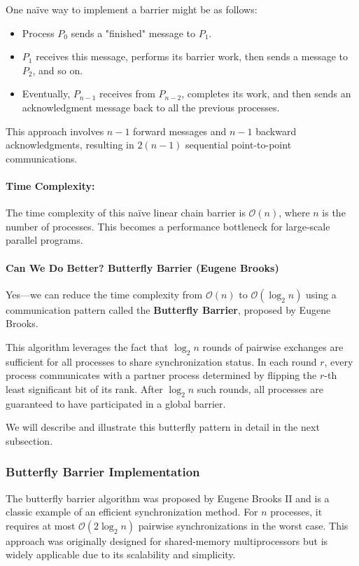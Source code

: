 \documentclass[12pt]{book}
\begin{document}
One naïve way to implement a barrier might be as follows:
\begin{itemize}
    \item Process $P_0$ sends a "finished" message to $P_1$.
    \item $P_1$ receives this message, performs its barrier work, then sends a message to $P_2$, and so on.
    \item Eventually, $P_{n-1}$ receives from $P_{n-2}$, completes its work, and then sends an acknowledgment message back to all the previous processes.
\end{itemize}
This approach involves $n - 1$ forward messages and $n - 1$ backward acknowledgments, resulting in $2(n - 1)$ sequential point-to-point communications.

\paragraph{Time Complexity:}  
The time complexity of this naïve linear chain barrier is $\mathcal{O}(n)$, where $n$ is the number of processes. This becomes a performance bottleneck for large-scale parallel programs.

\paragraph{Can We Do Better? Butterfly Barrier (Eugene Brooks)}  
Yes—we can reduce the time complexity from $\mathcal{O}(n)$ to $\mathcal{O}(\log_2 n)$ using a communication pattern called the \textbf{Butterfly Barrier}, proposed by Eugene Brooks.

This algorithm leverages the fact that $\log_2 n$ rounds of pairwise exchanges are sufficient for all processes to share synchronization status. In each round $r$, every process communicates with a partner process determined by flipping the $r$-th least significant bit of its rank. After $\log_2 n$ such rounds, all processes are guaranteed to have participated in a global barrier.

We will describe and illustrate this butterfly pattern in detail in the next subsection.
\subsubsection*{Butterfly Barrier Implementation}\label{subsec:butterfly}

The butterfly barrier algorithm was proposed by Eugene Brooks II and is a classic example of an efficient synchronization method. For $n$ processes, it requires at most $\mathcal{O}(2\log_2 n)$ pairwise synchronizations in the worst case. This approach was originally designed for shared-memory multiprocessors but is widely applicable due to its scalability and simplicity.
\end{document}

